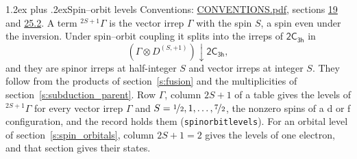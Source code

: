 \documentclass[10pt,a4paper]{article}
\makeatletter
\renewcommand\section{\@startsection{section}{1}{\z@}{-3ex plus -1ex minus -.2ex}%
  {1.2ex plus .2ex}{\normalfont\large\sffamily\bfseries\color{parttitle}}}
\numberwithin{equation}{section}
\newcommand{\grp}[1]{\mathsf{#1}}
\newcommand{\restr}[2]{#1\!\downarrow#2}
\newcommand{\irrJp}[2]{D^{(#1,#2)}}
\newcommand{\irrprod}{\otimes}
\newcommand{\term}[2]{{}^{#1}#2}
\makeatother
\begin{document}
\section{Spin--orbit levels}\label{s:spin_orbit}
Conventions: \href{../../CONVENTIONS.pdf}{CONVENTIONS.pdf}, sections \href{../../../rotation/CONVENTIONS.pdf\#conv.19}{19} and \href{../../CONVENTIONS.pdf\#conv.25.2}{25.2}.
\leavevmode\label{n:local.spin}\label{n:symbol.term}A term $\term{2S+1}{\Gamma}$ is the vector irrep $\Gamma$ with the spin $S$, a spin even under the inversion. Under spin--orbit coupling it splits into the irreps of $\grp{2C_{3h}}$ in
\begin{equation}\label{e:spinorbit}\restr{(\Gamma \irrprod \irrJp{S}{+1})}{\grp{2C_{3h}}},\end{equation}
and they are spinor irreps at half-integer $S$ and vector irreps at integer $S$. They follow from the products of section~\ref{s:fusion} and the multiplicities of section~\ref{s:subduction_parent}. Row $\Gamma$, column $2S + 1$ of a table gives the levels of $\term{2S+1}{\Gamma}$ for every vector irrep $\Gamma$ and $S = \nicefrac{1}{2}, 1, \dots, \nicefrac{7}{2}$, the nonzero spins of a d or f configuration, and the record holds them (\texttt{spinorbitlevels}). For an orbital level of section~\ref{s:spin_orbitals}, column $2S + 1 = 2$ gives the levels of one electron, and that section gives their states.
\end{document}
